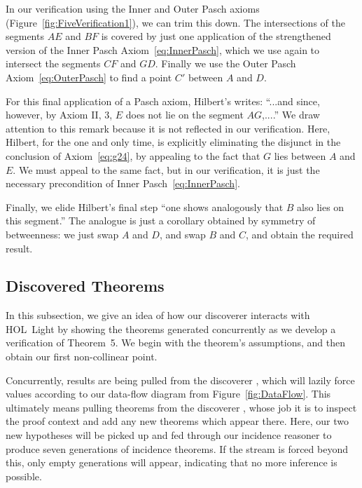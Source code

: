 In our verification using the Inner and Outer Pasch axioms (Figure~\ref{fig:FiveVerification1}), we can trim this down. The intersections of the segments $AE$ and $BF$ is covered by just one application of the strengthened version of the Inner Pasch Axiom~\eqref{eq:InnerPasch}, which we use again to intersect the segments $CF$ and $GD$. Finally we use the Outer Pasch Axiom~\eqref{eq:OuterPasch} to find a point $C'$ between $A$ and $D$. 

For this final application of a Pasch axiom, Hilbert's writes: ``...and since, however, by Axiom II, 3, $E$ does not lie on the segment $AG$,....'' We draw attention to this remark because it is not reflected in our verification. Here, Hilbert, for the one and only time, is explicitly eliminating the disjunct in the conclusion of Axiom~\ref{eq:g24}, by appealing to the fact that $G$ lies between $A$ and $E$. We must appeal to the same fact, but in our verification, it is just the necessary precondition of Inner Pasch~\eqref{eq:InnerPasch}.

Finally, we elide Hilbert's final step ``one shows analogously that $B$ also lies on this segment.'' The analogue is just a corollary obtained by symmetry of betweenness: we just swap $A$ and $D$, and swap $B$ and $C$, and obtain the required result.

\subsection{Discovered Theorems}
In this subsection, we give an idea of how our discoverer interacts with HOL~Light by showing the theorems generated concurrently as we develop a verification of Theorem~5. We begin with the theorem's assumptions, and then obtain our first non-collinear point.

\linebreak

Concurrently, results are being pulled from the discoverer , which will lazily force values according to our data-flow diagram from Figure~\ref{fig:DataFlow}. This ultimately means pulling theorems from the discoverer , whose job it is to inspect the proof context and add any new theorems which appear there. Here, our two new hypotheses will be picked up and fed through our incidence reasoner to produce seven generations of incidence theorems. If the stream is forced beyond this, only empty generations will appear, indicating that no more inference is possible.

